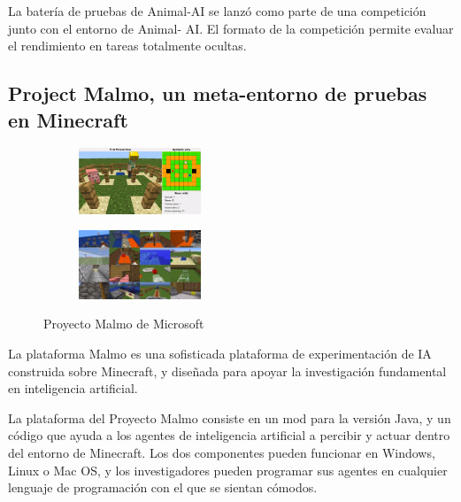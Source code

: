 La batería de pruebas de Animal-AI se lanzó como parte de una competición junto con el entorno de Animal- AI. El formato de la competición permite evaluar el rendimiento en tareas totalmente ocultas.

\subsection{Project Malmo, un meta-entorno de pruebas en Minecraft}\label{section:state-of-the-art:evaluation-enviroments-for-generalization-on-rl-algoritms:malmo}


\begin{figure}[ht!]
    \centering
    \begin{subfigure}
      \centering
      \includegraphics[width=0.4\textwidth]{Graphics/malmo-1.jpeg}
      \label{fig:malmo1}
    \end{subfigure}%
    \begin{subfigure}
      \centering
      \includegraphics[width=0.4\textwidth]{Graphics/malmo-2.jpeg}
      \label{fig:malmo2}
    \end{subfigure}%
    \caption{Proyecto Malmo de Microsoft}
    \label{fig:malmo}
\end{figure}

La plataforma Malmo es una sofisticada plataforma de experimentación de IA construida sobre Minecraft, y diseñada para apoyar la investigación fundamental en inteligencia artificial.

La plataforma del Proyecto Malmo consiste en un mod para la versión Java, y un código que ayuda a los agentes de inteligencia artificial a percibir y actuar dentro del entorno de Minecraft. Los dos componentes pueden funcionar en Windows, Linux o Mac OS, y los investigadores pueden programar sus agentes en cualquier lenguaje de programación con el que se sientan cómodos.

